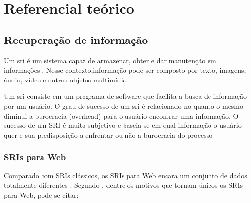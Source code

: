 
\pagebreak
\chapter{Referencial teórico}
\thispagestyle{fancy}

\section{Recuperação de informação}

Um \gls{sri} é um sistema capaz de armazenar, obter e dar manutenção em informações \cite[p. 2]{kowalski}. Nesse contexto,informação pode ser composto por texto, imagens, áudio, vídeo e outros objetos multimídia.

Um \gls{sri} consiste em um programa de software que facilita a busca de informação por um usuário. O grau de sucesso de um \gls{sri} é relacionado no quanto o mesmo diminui a burocracia (\gls{overhead}) para o usuário encontrar uma informação. O sucesso de um SRI é muito subjetivo e baseia-se em qual informação o usuário quer e sua predisposição a enfrentar ou não a burocracia do processo \cite[p. 4]{kowalski}

\subsection{SRIs para Web}

Comparado com SRIs clássicos, os SRIs para Web encara um conjunto de dados totalmente diferentes \cite[p. 2]{surveyir}. Segundo \cite{surveyir}, dentre os motivos que tornam únicos os SRIs para Web, pode-se citar:

